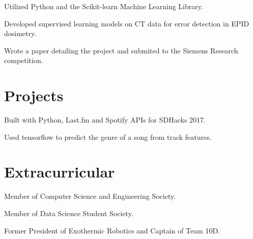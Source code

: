 \documentclass[]{deedy-resume-openfont}
\begin{document}
\begin{minipage}[t]{0.66\textwidth}
\begin{tightemize}
\item Utilized Python and the Scikit-learn Machine Learning Library.
\item Developed supervised learning models on CT data for error detection in EPID dosimetry.
\item Wrote a paper detailing the project and submited to the Siemens Research competition.
\end{tightemize}
\sectionsep


\section{Projects}

\begin{tightemize}
\item Built with Python, Last.fm and Spotify APIs for SDHacks 2017.
\item Used tensorflow to predict the genre of a song from track features.
\end{tightemize}
\sectionsep


\section{Extracurricular} 
\vspace{2mm}
\begin{tightemize}
\item Member of Computer Science and Engineering Society.
\item Member of Data Science Student Society.
\item Former President of Exothermic Robotics and Captain of Team 10D.
\end{tightemize}
\sectionsep

\end{minipage} 
\end{document}
